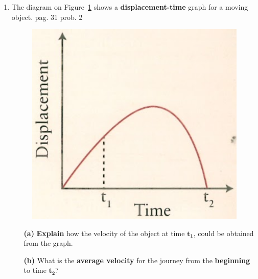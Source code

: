 \documentclass[A4,12pt]{article}
\begin{document}
\begin{enumerate}[label=\bfseries (\arabic*)]
\item The diagram on Figure~\ref{pag31prob2} shows a {\bf displacement-time} graph for a moving object. \cite{ASCCEA} pag. 31 prob. 2
%
\begin{figure}[H]
    \centering
    \includegraphics[scale=0.3]{pag31prob2.png}
    \caption{}
    \label{pag31prob2}
\end{figure}
%
\begin{itemize}
\item[\bf (a)] \textbf{Explain} how the velocity of the object at time $\bm{t_1}$, could be obtained from the graph.
\item[\bf (b)] What is the \textbf{average velocity} for the journey from the \textbf{beginning} to time $\bm{t_2}$?
\end{itemize}


















\end{enumerate}
\end{document}
